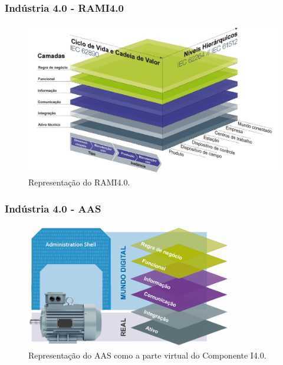 \documentclass[10pt]{beamer}
\begin{document}
\begin{frame}
	\frametitle{Indústria 4.0 - RAMI4.0}
	
	\begin{figure}[htb]
		\centering
		\caption{Representação do RAMI4.0.}
		\label{fig:rami4}
		\includegraphics[width=1\textwidth]{rami4.png}
	\end{figure}
	
\end{frame}
\begin{frame}
	\frametitle{Indústria 4.0 - AAS} 
	
	\begin{figure}[htb]
		\centering
		\caption{Representação do AAS como a parte virtual do Componente I4.0.}
		\label{fig:aas-rami}
		\includegraphics[width=0.8\textwidth]{aas-rami.png}
	\end{figure}
	
\end{frame}
\end{document}
